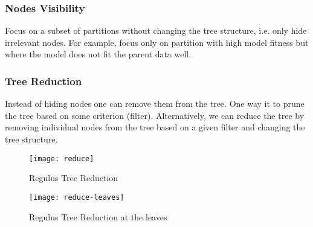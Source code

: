 \subsubsection*{Nodes Visibility}
Focus on a subset of partitions without changing the tree structure, i.e. only hide irrelevant nodes. For example, focus only on partition with high model fitness but where the model does not fit the parent data well.

\subsubsection*{Tree Reduction}
Instead of hiding nodes one can remove them from the tree. 
One way it to prune the tree based on some criterion (filter). Alternatively, we can reduce the tree by removing individual nodes from the tree based on a given filter and changing the tree structure.


\begin{figure}[htb]
    \begin{center}
     \texttt{[image: reduce]}
    \caption{Regulus Tree Reduction}
    \label{fig:reduce}
    \end{center}
\end{figure}

\begin{figure}[htb]
    \begin{center}
     \texttt{[image: reduce-leaves]}
    \caption{Regulus Tree Reduction at the leaves}
    \label{fig:reduce-leaves}
    \end{center}
\end{figure}